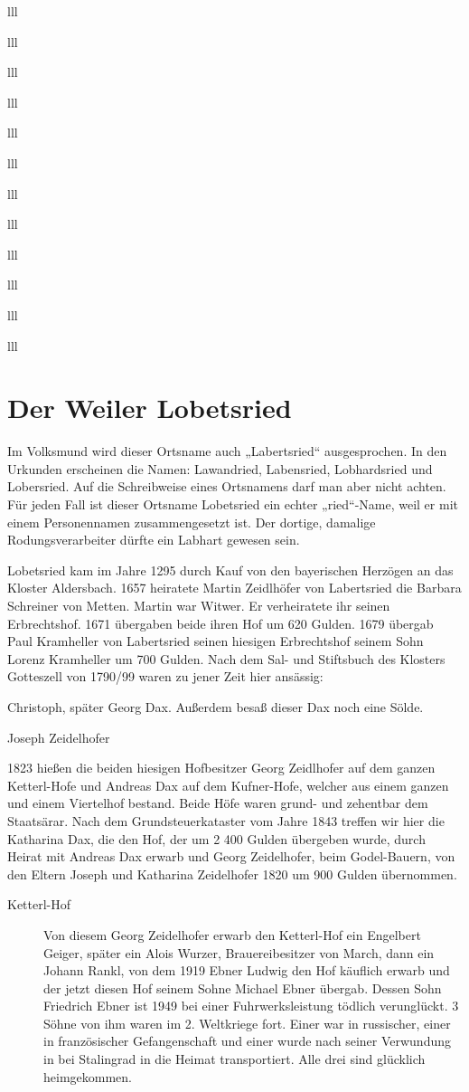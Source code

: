 \documentclass[12pt,a4pager]{book}
\begin{document}
\begin{tabuluar}{lll}
\begin{tabuluar}{lll}
\begin{tabuluar}{lll}
\begin{tabuluar}{lll}
\begin{tabuluar}{lll}
\begin{tabuluar}{lll}
\begin{tabuluar}{lll}
\begin{tabuluar}{lll}
\begin{tabuluar}{lll}
\begin{tabuluar}{lll}
\begin{tabuluar}{lll}
\begin{tabuluar}{lll}
\section{Der Weiler Lobetsried}

Im Volksmund wird dieser Ortsname auch „Labertsried“ ausgesprochen. In den
Urkunden erscheinen die Namen: Lawandried, Labensried, Lobhardsried und
Lobersried. Auf die Schreibweise eines Ortsnamens darf man aber nicht achten.
Für jeden Fall ist dieser Ortsname Lobetsried ein echter „ried“-Name, weil er
mit einem Personennamen zusammengesetzt ist. Der dortige, damalige
Rodungsverarbeiter dürfte ein Labhart gewesen sein.

Lobetsried kam im Jahre 1295 durch Kauf von den bayerischen Herzögen an das
Kloster Aldersbach. 1657 heiratete Martin Zeidlhöfer von Labertsried die Barbara
Schreiner von Metten. Martin war Witwer. Er verheiratete ihr seinen
Erbrechtshof. 1671 übergaben beide ihren Hof um 620 Gulden. 1679 übergab Paul
Kramheller von Labertsried seinen hiesigen Erbrechtshof seinem Sohn Lorenz
Kramheller um 700 Gulden. Nach dem Sal- und Stiftsbuch des Klosters Gotteszell
von 1790/99 waren zu jener Zeit hier ansässig:

Christoph, später Georg Dax. Außerdem besaß dieser Dax noch eine Sölde.

Joseph Zeidelhofer

1823 hießen die beiden hiesigen Hofbesitzer Georg Zeidlhofer auf dem ganzen
Ketterl-Hofe und Andreas Dax auf dem Kufner-Hofe, welcher aus einem ganzen und
einem Viertelhof bestand. Beide Höfe waren grund- und zehentbar dem Staatsärar.
Nach dem Grundsteuerkataster vom Jahre 1843 treffen wir hier die Katharina Dax,
die den Hof, der um 2 400 Gulden übergeben wurde, durch Heirat mit Andreas Dax
erwarb und Georg Zeidelhofer, beim Godel-Bauern, von den Eltern Joseph und
Katharina Zeidelhofer 1820 um 900 Gulden übernommen.

\begin{description}
\item[Ketterl-Hof] Von diesem Georg Zeidelhofer erwarb den Ketterl-Hof ein
Engelbert Geiger, später ein Alois Wurzer, Brauereibesitzer von March, dann ein
Johann Rankl, von dem 1919 Ebner Ludwig den Hof käuflich erwarb und der jetzt
diesen Hof seinem Sohne Michael Ebner übergab. Dessen Sohn Friedrich Ebner ist
1949 bei einer Fuhrwerksleistung tödlich verunglückt. 3 Söhne von ihm waren im
2. Weltkriege fort. Einer war in russischer, einer in französischer
Gefangenschaft und einer wurde nach seiner Verwundung in bei Stalingrad in die
Heimat transportiert. Alle drei sind glücklich heimgekommen.


\end{description}
\end{tabuluar}
\end{tabuluar}
\end{tabuluar}
\end{tabuluar}
\end{tabuluar}
\end{tabuluar}
\end{tabuluar}
\end{tabuluar}
\end{tabuluar}
\end{tabuluar}
\end{tabuluar}
\end{tabuluar}
\end{document}

